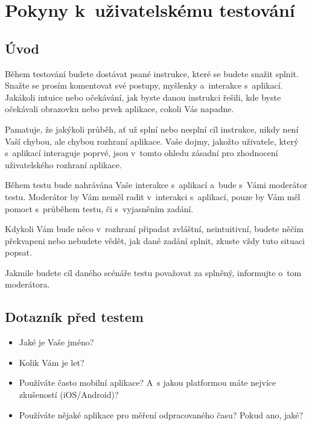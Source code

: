 \chapter{Pokyny k uživatelskému testování}\label{appendix:ui-testing-instructions}

\section*{Úvod}

Během testování budete dostávat psané instrukce, které se budete snažit splnit. Snažte se prosím komentovat své postupy, myšlenky a~interakce s~aplikací. Jakákoli intuice nebo očekávání, jak byste danou instrukci řešili, kde byste očekávali obrazovku nebo prvek aplikace, cokoli Vás napadne.

Pamatuje, že jakýkoli průběh, ať už splní nebo nesplní cíl instrukce, nikdy není Vaší chybou, ale chybou rozhraní aplikace. Vaše dojmy, jakožto uživatele, který s~aplikací interaguje poprvé, jsou v tomto ohledu zásadní pro zhodnocení uživatelského rozhraní aplikace.

Během testu bude nahrávána Vaše interakce s aplikací a~bude s~Vámi moderátor testu. Moderátor by Vám neměl radit v~interakci s~aplikací, pouze by Vám měl pomoct s~průběhem testu, či s~vyjasněním zadání.

Kdykoli Vám bude něco v~rozhraní připadat zvláštní, neintuitivní, budete něčím překvapeni nebo nebudete vědět, jak dané zadání splnit, zkuste vždy tuto situaci popsat.

Jakmile budete cíl daného scénáře testu považovat za splněný, informujte o~tom moderátora.

\section*{Dotazník před testem}

\begin{itemize}
\item Jaké je Vaše jméno?
\item Kolik Vám je let?
\item Používáte často mobilní aplikace? A~s jakou platformou máte nejvíce zkušeností (iOS/Android)?
\item Používáte nějaké aplikace pro měření odpracovaného času? Pokud ano, jaké?
\end{itemize}

